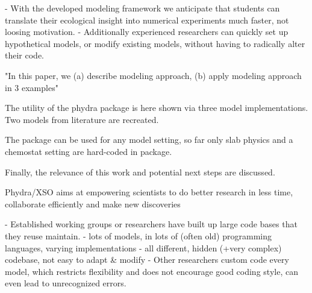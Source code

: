 \documentclass[journal abbreviation, manuscript]{copernicus}
\begin{document}
- With the developed modeling framework we anticipate that students can translate their ecological insight into numerical experiments much faster, not loosing motivation.
- Additionally experienced researchers can quickly set up hypothetical models, or modify existing models, without having to radically alter their code.


"In this paper, we (a) describe modeling approach, (b) apply modeling approach in 3 examples"

The utility of the phydra package is here shown via three model implementations. Two models from literature are recreated.

The package can be used for any model setting, so far only slab physics and a chemostat setting are hard-coded in package.

Finally, the relevance of this work and potential next steps are discussed.

Phydra/XSO aims at empowering scientists to do better research in less time, collaborate efficiently and make new discoveries











- Established working groups or researchers have built up large code bases that they reuse maintain.
- lots of models, in lots of (often old) programming languages, varying implementations
- all different, hidden (+very complex) codebase, not easy to adapt \& modify
- Other researchers custom code every model, which restricts flexibility and does not encourage good coding style, can even lead to unrecognized errors.
\end{document}

